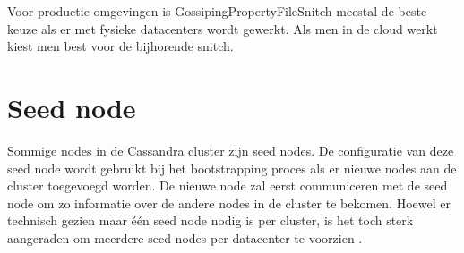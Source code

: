 Voor productie omgevingen is GossipingPropertyFileSnitch meestal de beste keuze als er met fysieke datacenters wordt gewerkt.
Als men in de cloud werkt kiest men best voor de bijhorende snitch.

\section{Seed node}
Sommige nodes in de Cassandra cluster zijn seed nodes.
De configuratie van deze seed node wordt gebruikt bij het bootstrapping proces als er nieuwe nodes aan de cluster toegevoegd worden.
De nieuwe node zal eerst communiceren met de seed node om zo informatie over de andere nodes in de cluster te bekomen.
Hoewel er technisch gezien maar één seed node nodig is per cluster, is het toch sterk aangeraden om meerdere seed nodes per datacenter te voorzien \citep{kan2014cassandra}.